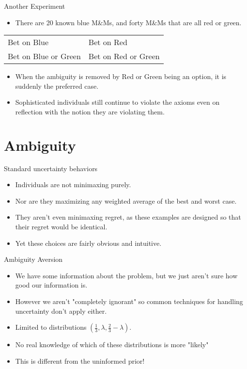 \documentclass[bigger]{beamer}
\begin{document}
\begin{frame}[label=sec-2-4]{Another Experiment}
\begin{itemize}
\item There are 20 known blue M\&Ms, and forty M\&Ms that are all red or
green.
\end{itemize}
\begin{center}
\begin{tabular}{ll}
Bet on Blue & Bet on Red\\
Bet on Blue or Green & Bet on Red or Green\\
\end{tabular}
\end{center}
\begin{itemize}
\item When the ambiguity is removed by Red or Green being an option, it is
suddenly the preferred case.
\item Sophisticated individuals still continue to violate the axioms even
on reflection with the notion they are violating them.
\end{itemize}
\end{frame}

\section{Ambiguity}
\label{sec-3}
\begin{frame}[label=sec-3-1]{Standard uncertainty behaviors}
\begin{itemize}
\item Individuals are not minimaxing purely.
\item Nor are they maximizing any weighted average of the best and worst
case.
\item They aren't even minimaxing regret, as these examples are designed
so that their regret would be identical.
\item Yet these choices are fairly obvious and intuitive.
\end{itemize}
\end{frame}

\begin{frame}[label=sec-3-2]{Ambiguity Aversion}
\begin{itemize}
\item We have some information about the problem, but we just aren't sure
how good our information is.
\item However we aren't "completely ignorant" so common techniques for
handling uncertainty don't apply either.
\item Limited to distributions $(\frac{1}{3}, \lambda, \frac{2}{3} - \lambda)$.
\item No real knowledge of which of these distributions is more "likely"
\item This is different from the uninformed prior!
\end{itemize}
\end{frame}
\end{document}
